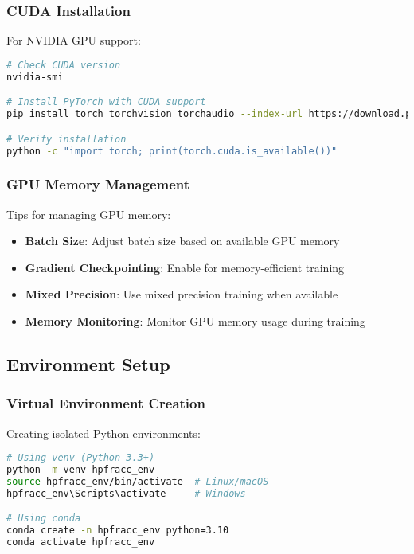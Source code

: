 \subsubsection{CUDA Installation}
For NVIDIA GPU support:

\begin{lstlisting}[language=bash, caption=CUDA Installation]
# Check CUDA version
nvidia-smi

# Install PyTorch with CUDA support
pip install torch torchvision torchaudio --index-url https://download.pytorch.org/whl/cu118

# Verify installation
python -c "import torch; print(torch.cuda.is_available())"
\end{lstlisting}

\subsubsection{GPU Memory Management}
Tips for managing GPU memory:
\begin{itemize}
    \item \textbf{Batch Size}: Adjust batch size based on available GPU memory
    \item \textbf{Gradient Checkpointing}: Enable for memory-efficient training
    \item \textbf{Mixed Precision}: Use mixed precision training when available
    \item \textbf{Memory Monitoring}: Monitor GPU memory usage during training
\end{itemize}

\subsection{Environment Setup}

\subsubsection{Virtual Environment Creation}
Creating isolated Python environments:

\begin{lstlisting}[language=bash, caption=Virtual Environment Setup]
# Using venv (Python 3.3+)
python -m venv hpfracc_env
source hpfracc_env/bin/activate  # Linux/macOS
hpfracc_env\Scripts\activate     # Windows

# Using conda
conda create -n hpfracc_env python=3.10
conda activate hpfracc_env
\end{lstlisting}

